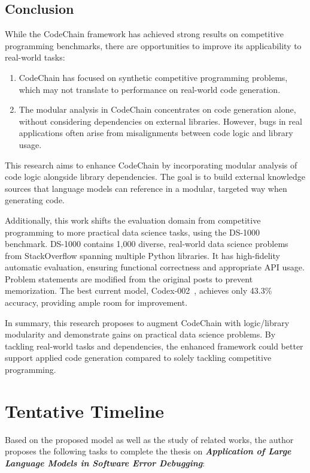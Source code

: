 \documentclass[a4paper,oneside]{book}
\begin{document}
\section{Conclusion}
While the CodeChain framework has achieved strong results on competitive programming benchmarks, there are opportunities to improve its applicability to real-world tasks:

\begin{enumerate}
    \item CodeChain has focused on synthetic competitive programming problems, which may not translate to performance on real-world code generation.

    \item The modular analysis in CodeChain concentrates on code generation alone, without considering dependencies on external libraries. However, bugs in real applications often arise from misalignments between code logic and library usage.
\end{enumerate}

This research aims to enhance CodeChain by incorporating modular analysis of code logic alongside library dependencies. The goal is to build external knowledge sources that language models can reference in a modular, targeted way when generating code.

Additionally, this work shifts the evaluation domain from competitive programming to more practical data science tasks, using the DS-1000~\cite{pmlr-v202-lai23b} benchmark. DS-1000 contains 1,000 diverse, real-world data science problems from StackOverflow spanning multiple Python libraries. It has high-fidelity automatic evaluation, ensuring functional correctness and appropriate API usage. Problem statements are modified from the original posts to prevent memorization. The best current model, Codex-002~\cite{madaan2022language}, achieves only 43.3\% accuracy, providing ample room for improvement.

In summary, this research proposes to augment CodeChain with logic/library modularity and demonstrate gains on practical data science problems. By tackling real-world tasks and dependencies, the enhanced framework could better support applied code generation compared to solely tackling competitive programming.

\chapter{Tentative Timeline}
Based on the proposed model as well as the study of related works, the author proposes the following tasks to complete the thesis on \textbf{\textit{Application of Large Language Models in Software Error Debugging}}:
\end{document}
